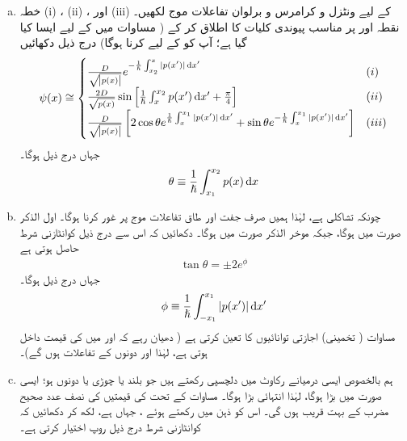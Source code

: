 \begin{enumerate}[a.]

\item
خطہ (i) ، (ii) ، اور (iii)  کے لیے ونٹزل و کرامرس و برلوان تفاعلات موج لکھیں۔ نقطہ  اور  پر مناسب پیوندی کلیات کا اطلاق کر کے ( مساوات  میں  کے لیے ایسا کیا گیا ہے؛ آپ کو  کے لیے کرنا ہوگا) درج ذیل دکھائیں
\begin{align*}
	\psi(x)\cong
	\begin{cases}
		\frac{D}{\sqrt{\abs{p(x)}}} e^{-\frac{1}{\hslash}\int^{x}_{x_{2}}|p(x')|\dif x'}& (i) \\
		\frac{2D}{\sqrt{p(x)}} \sin\left[\frac{1}{\hslash}\int^{x_{2}}_{x}p(x')\dif x'+\frac{\pi}{4}\right]& (ii) \\
		\frac{D}{\sqrt{\abs{p(x)}}}\left[2 \cos\theta e^{\frac{1}{\hslash}\int^{x_{1}}_{x}|p(x')|\dif x'} +\sin\theta e^{-\frac{1}{\hslash}\int^{x_{1}}_{x}|p(x')|\dif x'}\right]& (iii)
	\end{cases}
\end{align*}
جہاں درج ذیل ہوگا۔
\begin{align}\label{مساوات_وقب_تھیٹا}
	\theta\equiv\frac{1}{\hslash}\int^{x_{2}}_{x_{1}}p(x)\dif x
\end{align}
\item
چونکہ  تشاکلی ہے، لہٰذا ہمیں صرف جفت  اور طاق  تفاعلات موج پر غور کرنا ہوگا۔ اول الذکر صورت میں  ہوگا، جبکہ موخر الذکر صورت میں  ہوگا۔ دکھائیں کہ اس سے درج ذیل کوانٹازنی شرط حاصل ہوتی ہے
\begin{align}\label{مساوات_وقب_ٹینجنٹ}
	\tan\theta=\pm 2e^{\phi}
\end{align}
جہاں درج ذیل ہوگا۔
\begin{align}
	\phi\equiv\frac{1}{\hslash}\int^{x_{1}}_{-x_{1}}|p(x')|\dif x'
\end{align}
مساوات  ( تخمینی) اجازتی توانائیوں کا تعین کرتی ہے ( دھیان رہے کہ  اور  میں  کی قیمت داخل ہوتی ہے، لہٰذا  اور  دونوں  کے تفاعلات ہوں گے)۔
\item
 ہم بالخصوص ایسی درمیانے رکاوٹ میں دلچسپی رکھتے ہیں جو بلند یا چوڑی یا دونوں ہو؛ ایسی صورت میں  بڑا ہوگا، لہٰذا  انتہائی بڑا ہوگا۔ مساوات  کے تحت  کی قیمتیں  کی نصف عدد صحیح مضرب کے بہت قریب ہوں گی۔ اس کو ذہن میں رکھتے ہوئے ، جہاں  ہے، لکھ کر دکھائیں کہ کوانٹازنی شرط درج ذیل روپ اختیار کرتی ہے۔

\end{enumerate}
